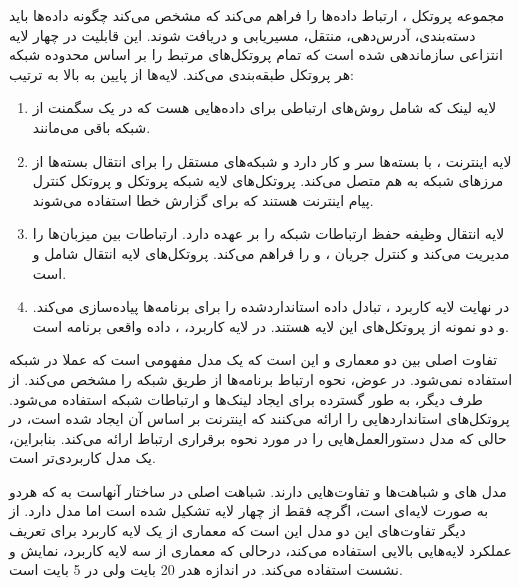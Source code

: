 \documentclass{article}
\begin{document}
مجموعه پروتکل ، ارتباط  داده‌ها را فراهم می‌کند که مشخص می‌کند چگونه داده‌ها باید دسته‌بندی، آدرس‌دهی، منتقل، مسیریابی و دریافت شوند.
این قابلیت در چهار لایه انتزاعی سازماندهی شده است که تمام پروتکل‌های مرتبط را بر اساس محدوده شبکه هر پروتکل طبقه‌بندی می‌کند. لایه‌ها از پایین به بالا به ترتیب:
\begin{enumerate}
	\item
	  لایه لینک  که شامل روش‌های ارتباطی برای داده‌هایی هست که در یک سگمنت از شبکه باقی می‌مانند. 
	\item 
	لایه اینترنت ، با بسته‌ها سر و کار دارد و شبکه‌های مستقل را برای انتقال بسته‌ها از مرزهای شبکه به هم متصل می‌کند. پروتکل‌های لایه شبکه پروتکل  و پروتکل کنترل پیام اینترنت  هستند که برای گزارش خطا استفاده می‌شوند. 
	\item
	لایه انتقال  وظیفه حفظ ارتباطات  شبکه را بر عهده دارد.  ارتباطات بین میزبان‌ها را مدیریت می‌کند و کنترل جریان ،  و  را فراهم می‌کند. پروتکل‌های لایه انتقال شامل  و  است. 
	\item
	در نهایت لایه کاربرد ، تبادل داده استاندارد‌شده را برای برنامه‌ها پیاده‌سازی می‌کند.  و  دو نمونه از پروتکل‌های این لایه هستند. در لایه کاربرد، ، داده واقعی برنامه است.
\end{enumerate}

تفاوت اصلی بین دو معماری  و  این است که  یک مدل مفهومی است که عملا در شبکه استفاده نمی‌شود. در عوض، نحوه ارتباط برنامه‌ها از طریق شبکه را مشخص می‌کند. از طرف دیگر،  به طور گسترده برای ایجاد لینک‌ها و ارتباطات شبکه استفاده می‌شود.
پروتکل‌های  استانداردهایی را ارائه می‌کنند که اینترنت بر اساس آن ایجاد شده است، در حالی که مدل  دستورالعمل‌هایی را در مورد نحوه برقراری ارتباط ارائه می‌کند. بنابراین،  یک مدل کاربردی‌تر است.

مدل های  و  شباهت‌ها و تفاوت‌هایی دارند. شباهت اصلی در ساختار آنهاست به که هردو به صورت لایه‌ای است، اگرچه  فقط از چهار لایه تشکیل شده است اما مدل  دارد.
از دیگر تفاوت‌های این دو مدل این است که معماری  از یک لایه کاربرد برای تعریف عملکرد لایه‌هایی بالایی استفاده می‌کند، درحالی که معماری  از سه لایه کاربرد، نمایش و نشست استفاده می‌کند. در  اندازه هدر  20 بایت ولی در  5 بایت است. 
\end{document}
